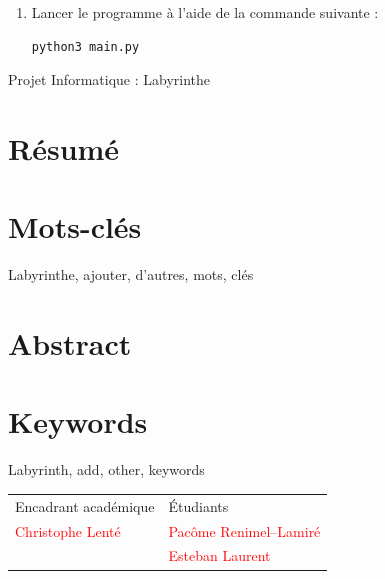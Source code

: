 \documentclass[12pt]{scrreprt} %
\begin{document}
\begin{enumerate}
    \item Lancer le programme à l'aide de la commande suivante :
          \begin{verbatim}
python3 main.py
    \end{verbatim}

\end{enumerate}



\newpage

\begin{center}
    \Huge
    Projet Informatique : Labyrinthe
\end{center}

\section*{Résumé}

\blindtext

\section*{Mots-clés}

Labyrinthe, ajouter, d'autres, mots, clés

\section*{Abstract}
\blindtext

\section*{Keywords}

Labyrinth, add, other, keywords

\hrulefill

\vfill


\begin{table}[h]
    \begin{tabularx}{\textwidth}{|X|Y|}
        \hline
        Encadrant académique              & Étudiants                               \\
        \textcolor{red}{Christophe Lenté} & \textcolor{red}{Pacôme Renimel--Lamiré} \\
                                          & \textcolor{red}{Esteban Laurent}        \\
        \hline
    \end{tabularx}
\end{table}
\end{document}
